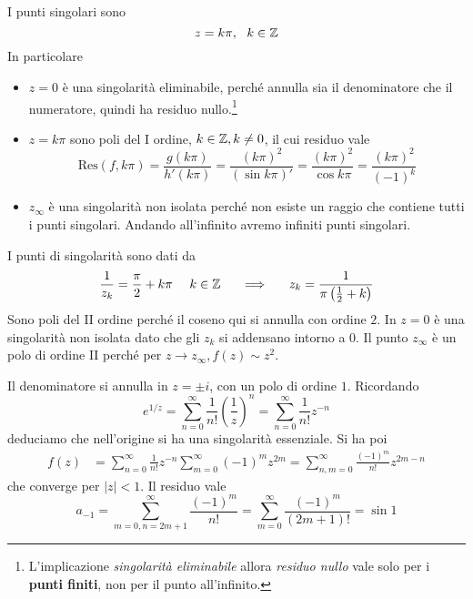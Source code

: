 I punti singolari sono
\begin{equation*}
z=k\pi ,\ \ k\in \mathbb{Z} 
\end{equation*}
In particolare
\begin{itemize}
\item $z=0$ è una singolarità eliminabile, perché annulla sia il denominatore che il numeratore, quindi ha residuo nullo.\footnote{L'implicazione \textit{singolarità eliminabile} allora \textit{residuo nullo} vale solo per i \textbf{punti finiti}, non per il punto all'infinito.}
\item $z=k\pi $ sono poli del I ordine, $k\in \mathbb{Z}  ,k\neq 0$, il cui residuo vale\begin{equation*}
\mathrm{Res}\left( f,k\pi \right) =\frac{g\left( k\pi \right)}{h'\left( k\pi \right)} =\frac{\left( k\pi \right)^{2}}{\left(\sin k\pi \right) '} =\frac{\left( k\pi \right)^{2}}{\cos k\pi } =\frac{\left( k\pi \right)^{2}}{\left( -1\right)^{k}}
\end{equation*}
\item $z_{\infty }$ è una singolarità non isolata perché non esiste un raggio che contiene tutti i punti singolari. Andando all'infinito avremo infiniti punti singolari.
\end{itemize}
\Soluzione

I punti di singolarità sono dati da
\begin{equation*}
\frac{1}{z_{k}} =\frac{\pi }{2} +k\pi \ \ \ \ k\in \ZZ  \ \ \ \ \implies \ \ \ \ z_{k} =\frac{1}{\pi \left(\frac{1}{2} +k\right)}
\end{equation*}
Sono poli del II ordine perché il coseno qui si annulla con ordine $2$. In $z=0$ è una singolarità non isolata dato che gli $z_{k}$ si addensano intorno a $0$. Il punto $z_{\infty }$ è un polo di ordine II perché per $z\rightarrow z_{\infty } ,f\left( z\right) \sim z^{2}$.
\Soluzione

Il denominatore si annulla in $z=\pm i$, con un polo di ordine $1$. Ricordando
\begin{equation*}
e^{1/z} =\sum\limits ^{\infty }_{n=0}\frac{1}{n!}\left(\frac{1}{z}\right)^{n} =\sum\limits ^{\infty }_{n=0}\frac{1}{n!} z^{-n}
\end{equation*}
deduciamo che nell'origine si ha una singolarità essenziale. Si ha poi
\begin{align*}
f\left( z\right) & =\sum\limits ^{\infty }_{n=0}\frac{1}{n!} z^{-n}\sum\limits ^{\infty }_{m=0}\left( -1\right)^{m} z^{2m} =\sum\limits ^{\infty }_{n,m=0}\frac{\left( -1\right)^{m}}{n!} z^{2m-n}
\end{align*}
che converge per $\left| z\right| < 1$. Il residuo vale
\begin{equation*}
a_{-1} =\sum\limits ^{\infty }_{m=0,n=2m+1}\frac{\left( -1\right)^{m}}{n!} =\sum\limits ^{\infty }_{m=0}\frac{\left( -1\right)^{m}}{\left( 2m+1\right) !} =\sin 1
\end{equation*}
\Soluzione

